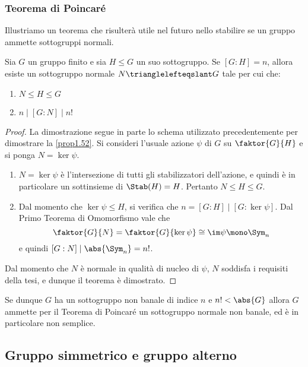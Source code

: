 \documentclass[11pt]{scrartcl}
\begin{document}
	\subsubsection{Teorema di Poincaré}
	
	Illustriamo un teorema che risulterà utile nel futuro nello stabilire se
	un gruppo ammette sottogruppi normali.
	
	\begin{theorem}
		\label{teorema1.50}
		Sia $G$ un gruppo finito e sia $H \leqslant G$ un suo sottogruppo. 
		Se $[G:H] = n$, allora esiste un sottogruppo normale $N \trianglelefteqslant G$ 
		tale per cui che:
		\begin{enumerate}[(1)]
			\item $N \leqslant H \leqslant G$
			\item $n \mid [G:N] \mid n!$
		\end{enumerate}
	\end{theorem}
	
	\begin{proof}
		La dimostrazione segue in parte lo schema utilizzato precedentemente per
		dimostrare la \autoref{prop1.52}.
		Si consideri l'usuale azione $\psi$ di $G$ su $\faktor{G}{H}$ e si
		ponga $N = \ker \psi$.
		\begin{enumerate}[(1)]
			\item $N = \ker \psi$ è l'intersezione di tutti gli stabilizzatori dell'azione,
			e quindi è in particolare un sottinsieme di $\Stab(H) = H$. Pertanto
			$N \leqslant H \leqslant G$.
			\item Dal momento che $\ker\psi \leqslant H$, si verifica che $n = [G:H] \mid [G:\ker\psi]$. Dal Primo Teorema di Omomorfismo vale che
			\[ \faktor{G}{N} = \faktor{G}{\ker\psi} \cong \im \psi \mono \Sym_n \]
			e quindi $[G : N] \mid \abs{\Sym_n} = n!$.
		\end{enumerate}
		Dal momento che $N$ è normale in qualità di nucleo di $\psi$, $N$ soddisfa i
		requisiti della tesi, e dunque il teorema è dimostrato.
	\end{proof}
	
	\begin{remark}
		Se dunque $G$ ha un sottogruppo non banale di indice $n$ e $n! < \abs{G}$
		allora $G$ ammette per il Teorema di Poincaré un sottogruppo normale non banale, ed è in particolare non semplice.
	\end{remark}
	
	\newpage
	
	\subsection{Gruppo simmetrico e gruppo alterno}
	
\end{document}
